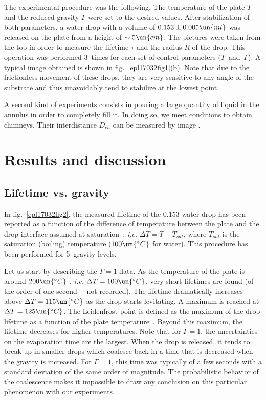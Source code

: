 \documentclass[doublecol,final]{epl2}
\begin{document}
The experimental procedure was the following. The temperature of the plate $T$ and the reduced gravity $\Gamma$ were set to the desired values. After stabilization of both parameters, a water drop with a volume of $0.153 \pm 0.005\un{ml}$ was released on the plate from a height of $\sim 5\un{cm}$. The pictures were taken from the top in order to measure the lifetime $\tau$ and the radius $R$ of the drop. This operation was performed 3~times for each set of control parameters ($T$~and~$\Gamma$). A typical image obtained is shown in fig.~\ref{epl17032fig1}(b). Note that due to the frictionless movement of these drops, they are very sensitive to any angle of the substrate and thus unavoidably tend to stabilize at the lowest point.

A second kind of experiments consists in pouring a large quantity of liquid in the annulus in order to completely fill it. In doing so, we meet conditions to obtain chimneys. Their interdistance $D_{ch}$ can be measured by image .

\section{Results and discussion}

\subsection{Lifetime vs. gravity}

In fig.~\ref{epl17032fig2}, the measured lifetime of the 0.153 water drop has been reported as a function of the difference of temperature between the plate and the drop interface assumed at saturation~\cite{epl17032bib3}, \textit{i.e.} $\Delta T=T-T_{\textit{sat}}$, where $T_{\textit{sat}}$ is the saturation (boiling) temperature ($100\un{^{\circ}C}$ for water). This procedure has been performed for 5~gravity levels.

Let us start by describing the $\Gamma=1$ data. As the temperature of the plate is around $200\un{^{\circ}C}$ , \textit{i.e.} $\Delta T = 100\un{^{\circ}C}$, very short lifetimes are found (of the order of one second ---not recorded). The lifetime dramatically increases above $\Delta T = 115\un{^\circ C}$ as the drop starts levitating. A maximum is reached at $\Delta T = 125\un{^\circ C}$. The Leidenfrost point is defined as the maximum of the drop lifetime as a function of the plate temperature~\cite{epl17032bib1}. Beyond this maximum, the lifetime decreases for higher temperatures. Note that for $\Gamma=1$, the uncertainties on the evaporation time are the largest. When the drop is released, it tends to break up in smaller drops which coalesce back in a time that is decreased when the gravity is increased. For $\Gamma = 1$, this time was typically of a few seconds with a standard deviation of the same order of magnitude. The probabilistic behavior of the coalescence makes it impossible to draw any conclusion on this particular phenomenon with our experiments.
\end{document}
